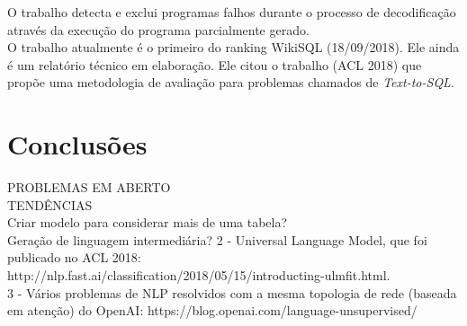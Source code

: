 \documentclass{article}
\begin{document}
O trabalho \citep{2018arXiv180703100W} detecta e exclui programas falhos durante o processo de decodificação através da execução do programa parcialmente gerado. \\

O trabalho \citep{shi2018incsql} atualmente é o primeiro do ranking WikiSQL (18/09/2018). Ele ainda é um relatório técnico em elaboração. Ele citou o trabalho \citep{finegan2018improving} (ACL 2018) que propõe uma metodologia de avaliação para problemas chamados de \textit{Text-to-SQL}.\\


\section{Conclusões\label{conclusoes}}

PROBLEMAS EM ABERTO\\

TENDÊNCIAS\\

Criar modelo para considerar mais de uma tabela?\\

Geração de linguagem intermediária? 2 - Universal Language Model, que foi publicado no ACL 2018: http://nlp.fast.ai/classification/2018/05/15/introducting-ulmfit.html.\\

3 - Vários problemas de NLP resolvidos com a mesma topologia de rede (baseada em atenção) do OpenAI: https://blog.openai.com/language-unsupervised/\\








\end{document}
